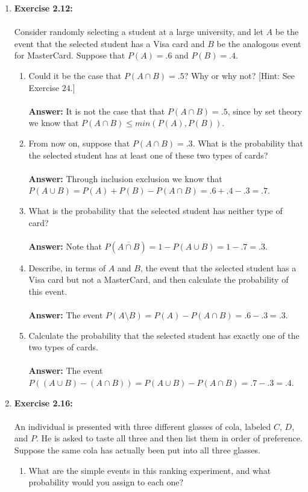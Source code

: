 \documentclass[12pt]{article}
\theoremstyle{homework}
\begin{document}
\begin{enumerate}
\item\hspace{.5in}\textbf{Exercise 2.12:}\\
\\
Consider randomly selecting a student at a large university, and let $A$ be the event that the selected student has a Visa card and $B$ be the analogous event for MasterCard. Suppose that $P(A)= .6$ and $P(B) = .4$.
\begin{enumerate}
\item Could it be the case that $P(A \cap B) = .5$? Why or why not? [Hint: See Exercise $24$.]\\
\\
 \textbf{Answer:} It is not the case that that $P(A \cap B) = .5$, since by set theory we know that $P(A \cap B) \leq min(P(A), P(B))$.
 \\
\item From now on, suppose that $P(A \cap B) = .3$. What is the probability that the selected student has at least one of these two types of cards?\\
\\
 \textbf{Answer:} Through inclusion exclusion we know that $P(A \cup B) = P(A) + P(B) - P(A \cap B) = .6 + .4 - .3 = .7$. 
 \\
\item What is the probability that the selected student has neither type of card?\\
\\
 \textbf{Answer:} Note that $P(\overline{A \cap B}) = 1 - P(A \cup B) = 1 - .7 = .3$.
 \\
\item Describe, in terms of $A$ and $B$, the event that the selected student has a Visa card but not a MasterCard, and then calculate the probability of this event.\\
\\
 \textbf{Answer:} The event $P(A\setminus B) = P(A) - P(A \cap B) = .6 - .3 = .3$.
 \\
\item Calculate the probability that the selected student has exactly one of the two types of cards.\\
\\
 \textbf{Answer:} The event $P((A \cup B) - (A \cap B)) = P(A \cup B) - P(A \cap B) = .7  - .3 = .4$.
 \\
\end{enumerate}
\vspace{1in}


\item\hspace{.5in}\textbf{Exercise 2.16:}\\
\\
An individual is presented with three different glasses of cola, labeled $C$, $D$, and $P$. He is asked to taste all three and then list them in order of preference. Suppose the same cola has actually been put into all three glasses.
\begin{enumerate}
\item What are the simple events in this ranking experiment, and what probability would you assign to each one?\\


\end{enumerate}
\end{enumerate}
\end{document}
